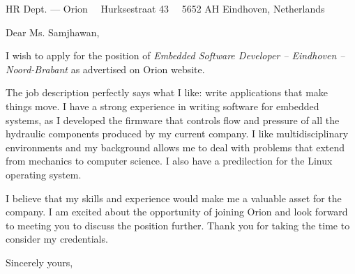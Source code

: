 \documentclass{scrlttr2}
\renewcommand{\\}{\ {\large\textperiodcentered}\ }
\begin{document}

\begin{letter}{ %
HR Dept. --- Orion\\
Hurksestraat 43\\
5652 AH Eindhoven, Netherlands
}


\opening{Dear Ms. Samjhawan,}

I wish to apply for the position of \emph{Embedded Software Developer – Eindhoven – Noord-Brabant} as advertised on Orion website.\\

The job description perfectly says what I like: write applications that make things move. I have a strong experience in writing software for embedded systems, as I developed the firmware that controls flow and pressure of all the hydraulic components produced by my current company. I like multidisciplinary environments and my background allows me to deal with problems that extend from mechanics to computer science. I also have a predilection for the Linux operating system.\\

I believe that my skills and experience would make me a valuable asset for the company. 
I am excited about the opportunity of joining Orion and look forward to meeting you to discuss the position further. Thank you for taking the time to consider my credentials.\\


Sincerely yours, \\ \\


\end{letter}
\end{document}
